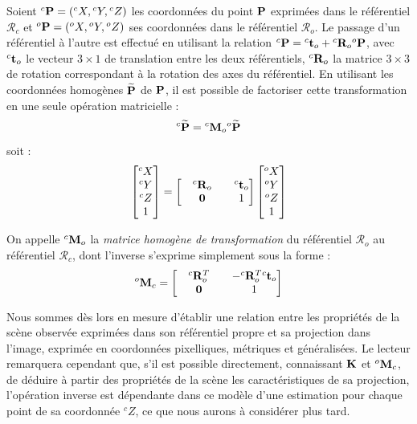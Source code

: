 Soient ${}^c{\bf P} = ({}^cX, {}^cY, {}^cZ)$ les coordonnées du point ${\bf P}$ exprimées dans le référentiel $\mathcal R_c$ et ${}^o{\bf P} = ({}^oX, {}^oY, {}^oZ)$ ses coordonnées dans le référentiel $\mathcal R_o$. Le passage d'un référentiel à l'autre est effectué en utilisant la relation ${}^c{\bf P} = {}^c{\bf t}_o + {}^c{\bf R}_o {}^o{\bf P}$, avec ${}^c{\bf t}_o$ le vecteur $3\times 1$ de translation entre les deux référentiels, ${}^c{\bf R}_o$ la matrice $3\times 3$ de rotation correspondant à la rotation des axes du référentiel. En utilisant les coordonnées homogènes $\widetilde {\bf P}$ de ${\bf P}$, il est possible de factoriser cette transformation en une seule opération matricielle :
\begin{equation}
{}^c \widetilde {\bf P} = {}^c {\bf M}_o {}^o \widetilde {\bf P}
\label{intro:eq18}
\end{equation}
soit :
\begin{equation}
\begin{bmatrix}
{}^cX \\ {}^cY \\ {}^cZ \\ 1
\end{bmatrix}
=
\begin{bmatrix}
&  {}^c{\bf R}_o & & {}^c{\bf t}_o \\
& {\bf 0} & & 1
\end{bmatrix}
\begin{bmatrix}
{}^oX \\ {}^oY \\ {}^oZ \\ 1
\end{bmatrix}
\label{intro:eq19}
\end{equation}

On appelle ${}^c{\bf M}_o$ la {\it matrice homogène de transformation} du référentiel $\mathcal R_o$ au référentiel $\mathcal R_c$, dont l'inverse s'exprime simplement sous la forme :
\begin{equation}
{}^o{\bf M}_c = 
\begin{bmatrix}
&  {}^c{\bf R}_o^T & & -{}^c{\bf R}_o^T {}^c{\bf t}_o \\
& {\bf 0} & & 1
\end{bmatrix}
\label{intro:eq20}
\end{equation}

Nous sommes dès lors en mesure d'établir une relation entre les propriétés de la scène observée exprimées dans son référentiel propre et sa projection dans l'image, exprimée en coordonnées pixelliques, métriques et généralisées. Le lecteur remarquera cependant que, s'il est possible directement, connaissant ${\bf K}$ et ${}^o{\bf M}_c$, de déduire à partir des propriétés de la scène les caractéristiques de sa projection, l'opération inverse est dépendante dans ce modèle d'une estimation pour chaque point de sa coordonnée ${}^cZ$, ce que nous aurons à considérer plus tard.

